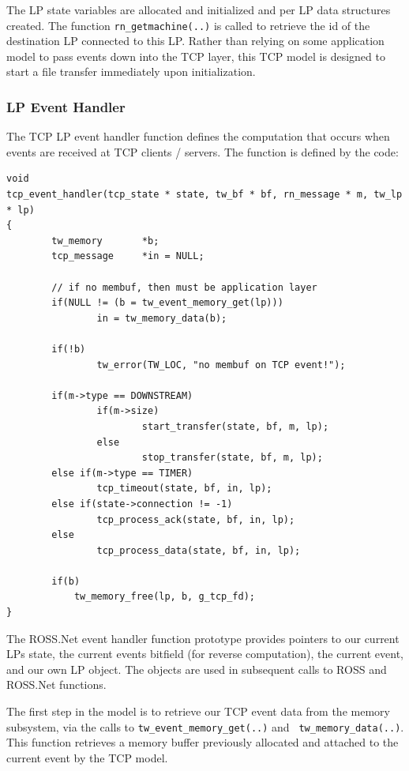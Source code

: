 \documentclass[12pt]{article}
\begin{document}
The LP state variables are allocated and initialized and per LP data
 structures created.  The function {\tt rn\_getmachine(..)} is called to
 retrieve the id of the destination LP connected to this LP.  Rather than
 relying on some application model to pass events down into the TCP layer,
 this TCP model is designed to start a file transfer immediately upon
 initialization.

\subsubsection{LP Event Handler}

The TCP LP event handler function defines the computation that occurs when
 events are received at TCP clients / servers.  The function is defined by the
 code:

\begin{small}
\begin{verbatim}
void
tcp_event_handler(tcp_state * state, tw_bf * bf, rn_message * m, tw_lp * lp)
{
        tw_memory       *b;
        tcp_message     *in = NULL;

        // if no membuf, then must be application layer
        if(NULL != (b = tw_event_memory_get(lp)))
                in = tw_memory_data(b);

        if(!b)
                tw_error(TW_LOC, "no membuf on TCP event!");

        if(m->type == DOWNSTREAM)
                if(m->size)
                        start_transfer(state, bf, m, lp);
                else
                        stop_transfer(state, bf, m, lp);
        else if(m->type == TIMER)
                tcp_timeout(state, bf, in, lp);
        else if(state->connection != -1)
                tcp_process_ack(state, bf, in, lp);
        else
                tcp_process_data(state, bf, in, lp);

        if(b)
            tw_memory_free(lp, b, g_tcp_fd);
}
\end{verbatim}
\end{small}

The ROSS.Net event handler function prototype provides pointers to our current
LPs state, the current events bitfield (for reverse computation), the current
event, and our own LP object.  The objects are used in subsequent calls to
ROSS and ROSS.Net functions.

The first step in the model is to retrieve our TCP event data from the memory
subsystem, via the calls to {\tt tw\_event\_memory\_get(..)} and {\tt
  tw\_memory\_data(..)}.  This function retrieves a memory buffer previously
allocated and attached to the current event by the TCP model.
\end{document}
